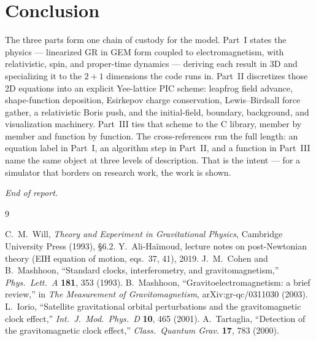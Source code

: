 \documentclass[11pt]{article}
\begin{document}
\section{Conclusion}

The three parts form one chain of custody for the model. Part~I states the
physics --- linearized GR in GEM form coupled to electromagnetism, with
relativistic, spin, and proper-time dynamics --- deriving each result in 3D and
specializing it to the $2{+}1$ dimensions the code runs in. Part~II discretizes
those 2D equations into an explicit Yee-lattice PIC scheme: leapfrog field
advance, shape-function deposition, Esirkepov charge conservation,
Lewis--Birdsall force gather, a relativistic Boris push, and the initial-field,
boundary, background, and visualization machinery. Part~III ties that scheme to
the C library, member by member and function by function. The cross-references
run the full length: an equation label in Part~I, an algorithm step in Part~II,
and a function in Part~III name the same object at three levels of description.
That is the intent --- for a simulator that borders on research work, the work is
shown.

\bigskip
\noindent\textit{End of report.}

\begin{thebibliography}{9}
 C.~M.~Will, \textit{Theory and Experiment in Gravitational
  Physics}, Cambridge University Press (1993), \S6.2.
 Y.~Ali-Ha\"imoud, lecture notes on post-Newtonian
  theory (EIH equation of motion, eqs.~37, 41), 2019.
 J.~M.~Cohen and B.~Mashhoon, ``Standard clocks,
  interferometry, and gravitomagnetism,'' \textit{Phys.\ Lett.\ A} \textbf{181},
  353 (1993).
 B.~Mashhoon, ``Gravitoelectromagnetism: a brief review,''
  in \textit{The Measurement of Gravitomagnetism}, arXiv:gr-qc/0311030 (2003).
 L.~Iorio, ``Satellite gravitational orbital perturbations
  and the gravitomagnetic clock effect,'' \textit{Int.\ J.\ Mod.\ Phys.\ D}
  \textbf{10}, 465 (2001).
 A.~Tartaglia, ``Detection of the gravitomagnetic clock
  effect,'' \textit{Class.\ Quantum Grav.} \textbf{17}, 783 (2000).
\end{thebibliography}
\end{document}

